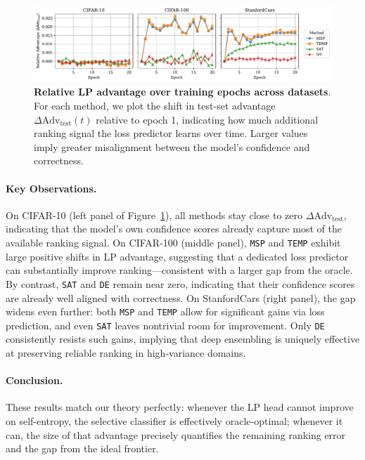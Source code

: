 \begin{figure}
    \centering
    \includegraphics[width=1\linewidth]{figs/sc_bounds/adv_te.pdf}
    \caption[Relative LP advantage over training epochs across datasets.]{\textbf{Relative LP advantage over training epochs across datasets}. For each method, we plot the shift in test-set advantage $\Delta\mathrm{Adv}_{\mathrm{test}}(t)$ relative to epoch 1, indicating how much additional ranking signal the loss predictor learns over time. Larger values imply greater misalignment between the model’s confidence and correctness.}

    \label{fig:adv_te}
\end{figure}

\paragraph{Key Observations.}
On CIFAR-10 (left panel of Figure~\ref{fig:adv_te}), all methods stay close to zero $\Delta\mathrm{Adv}_{\mathrm{test}}$, indicating that the model's own confidence scores already capture most of the available ranking signal. On CIFAR-100 (middle panel), \texttt{MSP} and \texttt{TEMP} exhibit large positive shifts in LP advantage, suggesting that a dedicated loss predictor can substantially improve ranking—consistent with a larger gap from the oracle. By contrast, \texttt{SAT} and \texttt{DE} remain near zero, indicating that their confidence scores are already well aligned with correctness. On StanfordCars (right panel), the gap widens even further: both \texttt{MSP} and \texttt{TEMP} allow for significant gains via loss prediction, and even \texttt{SAT} leaves nontrivial room for improvement. Only \texttt{DE} consistently resists such gains, implying that deep ensembling is uniquely effective at preserving reliable ranking in high-variance domains.

\paragraph{Conclusion.}  
These results match our theory perfectly: whenever the LP head cannot improve on self-entropy, the selective classifier is effectively oracle‐optimal; whenever it can, the size of that advantage precisely quantifies the remaining ranking error and the gap from the ideal frontier.

